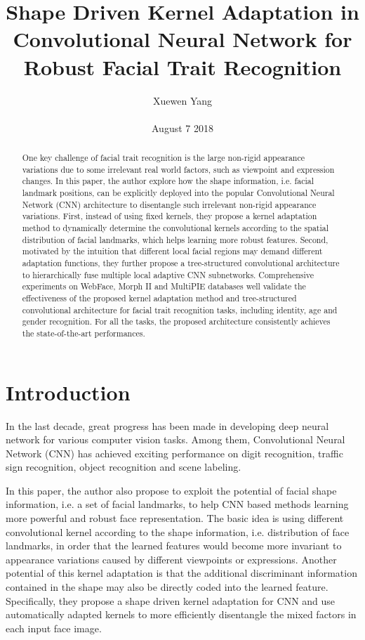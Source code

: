 \documentclass[10pt,twocolumn,letterpaper]{article}
\author{Xuewen Yang\\\\
August 7 2018}
\title{Shape Driven Kernel Adaptation in Convolutional Neural Network for Robust Facial Trait Recognition}
\begin{document}
\maketitle
\begin{abstract}
One key challenge of facial trait recognition is the large
non-rigid appearance variations due to some irrelevant real
world factors, such as viewpoint and expression changes.
In this paper, the author explore how the shape information, i.e. facial
landmark positions, can be explicitly deployed into the
popular Convolutional Neural Network (CNN) architecture
to disentangle such irrelevant non-rigid appearance variations.
First, instead of using fixed kernels, they propose a kernel
adaptation method to dynamically determine the convolutional
kernels according to the spatial distribution of facial
landmarks, which helps learning more robust features.
Second, motivated by the intuition that different local facial
regions may demand different adaptation functions, they
further propose a tree-structured convolutional architecture
to hierarchically fuse multiple local adaptive CNN subnetworks.
Comprehensive experiments on WebFace, Morph II
and MultiPIE databases well validate the effectiveness of
the proposed kernel adaptation method and tree-structured
convolutional architecture for facial trait recognition tasks,
including identity, age and gender recognition. For all the
tasks, the proposed architecture consistently achieves the
state-of-the-art performances.
\end{abstract}
\section{Introduction}
In the last decade, great progress has been made in developing
deep neural network for various computer vision
tasks. Among them, Convolutional Neural Network
(CNN) has achieved exciting performance on
digit recognition\cite{Schmidhuber2012Multi}, traffic sign recognition\cite{Schmidhuber2012Multi}, object
recognition\cite{Krizhevsky2012ImageNet} and scene labeling.

In this paper, the author also propose to exploit the potential
of facial shape information, i.e. a set of facial landmarks,
to help CNN based methods learning more powerful and
robust face representation. The basic idea is using different
convolutional kernel according to the shape information,
i.e. distribution of face landmarks, in order that the learned
features would become more invariant to appearance variations
caused by different viewpoints or expressions. Another
potential of this kernel adaptation is that the additional
discriminant information contained in the shape may also
be directly coded into the learned feature. Specifically, they
propose a shape driven kernel adaptation for CNN and use
automatically adapted kernels to more efficiently disentangle the mixed factors in each input face image.
\end{document}
